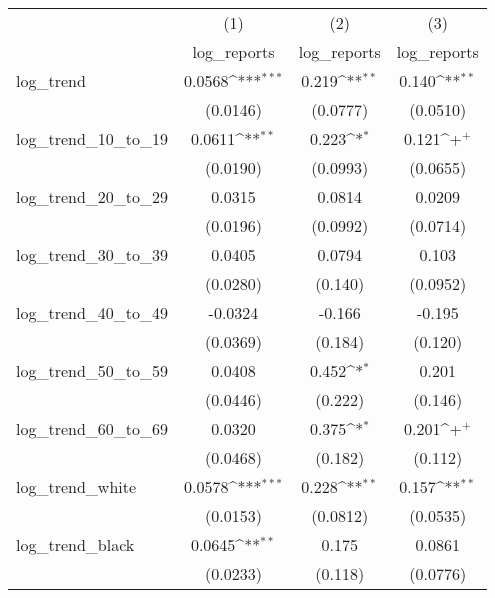 {
\def\sym#1{\ifmmode^{#1}\else\(^{#1}\)\fi}
\begin{tabular}{l*{3}{c}}
\hline\hline
            &\multicolumn{1}{c}{(1)}&\multicolumn{1}{c}{(2)}&\multicolumn{1}{c}{(3)}\\
            &\multicolumn{1}{c}{log\_reports}&\multicolumn{1}{c}{log\_reports}&\multicolumn{1}{c}{log\_reports}\\
\hline
log\_trend   &      0.0568\sym{***}&       0.219\sym{**} &       0.140\sym{**} \\
            &    (0.0146)         &    (0.0777)         &    (0.0510)         \\
\hline
log\_trend\_10\_to\_19&      0.0611\sym{**} &       0.223\sym{*}  &       0.121\sym{+}  \\
            &    (0.0190)         &    (0.0993)         &    (0.0655)         \\
\hline
log\_trend\_20\_to\_29&      0.0315         &      0.0814         &      0.0209         \\
            &    (0.0196)         &    (0.0992)         &    (0.0714)         \\
\hline
log\_trend\_30\_to\_39&      0.0405         &      0.0794         &       0.103         \\
            &    (0.0280)         &     (0.140)         &    (0.0952)         \\
\hline
log\_trend\_40\_to\_49&     -0.0324         &      -0.166         &      -0.195         \\
            &    (0.0369)         &     (0.184)         &     (0.120)         \\
\hline
log\_trend\_50\_to\_59&      0.0408         &       0.452\sym{*}  &       0.201         \\
            &    (0.0446)         &     (0.222)         &     (0.146)         \\
\hline
log\_trend\_60\_to\_69&      0.0320         &       0.375\sym{*}  &       0.201\sym{+}  \\
            &    (0.0468)         &     (0.182)         &     (0.112)         \\
\hline
log\_trend\_white&      0.0578\sym{***}&       0.228\sym{**} &       0.157\sym{**} \\
            &    (0.0153)         &    (0.0812)         &    (0.0535)         \\
\hline
log\_trend\_black&      0.0645\sym{**} &       0.175         &      0.0861         \\
            &    (0.0233)         &     (0.118)         &    (0.0776)         \\

\end{tabular}}
